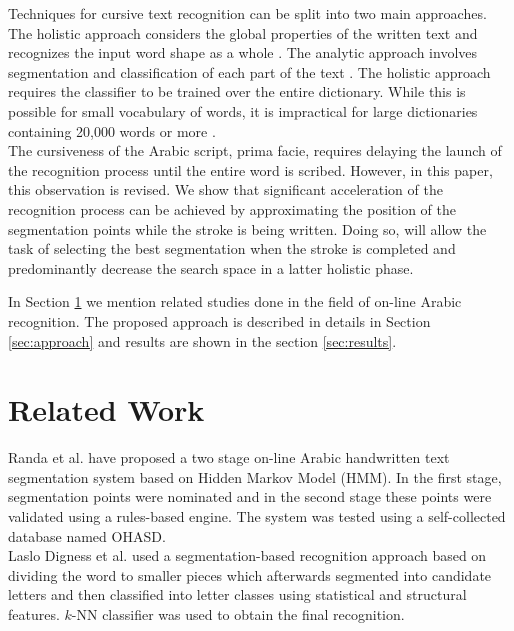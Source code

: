 \documentclass[10pt, conference, compsocconf]{IEEEtran}
\begin{document}
Techniques for cursive text recognition can be split into two main approaches. 
The holistic approach considers the global properties of the written text and recognizes the input word shape as a whole \cite{biadsy2011segmentation, saabni2009hierarchical}. 
The analytic approach involves segmentation and classification of each part of the text \cite{abdulla2008off, sari2002off, Dinges2011}. 
The holistic approach requires the classifier to be trained over the entire dictionary. 
While this is possible for small vocabulary of words, it is impractical for large dictionaries containing 20,000 words or more \cite{elanwar2012unconstrained}.\\

{\color{blue}
The cursiveness of the Arabic script, prima facie, requires delaying the launch of the recognition process until the entire word is scribed. 
However, in this paper, this observation is revised. 
We show that significant acceleration of the recognition process can be achieved by approximating the position of the segmentation points while the stroke is being written. 
Doing so, will allow the task of selecting the best segmentation when the stroke is completed and predominantly decrease the search space in a latter holistic phase.\\}

In Section \ref{sec:related_work} we mention related studies done in the field of on-line Arabic recognition. 
The proposed approach is described in details in Section \ref{sec:approach} and results are shown in the section \ref{sec:results}. 

\section{Related Work}
\label{sec:related_work}

Randa et al. \cite{elanwar2012unconstrained} have proposed a two stage on-line Arabic handwritten text segmentation system based on Hidden Markov Model (HMM). 
In the first stage, segmentation points were nominated and in the second stage these points were validated using a rules-based engine. 
The system was tested using a self-collected database named OHASD.\\

Laslo Digness et al. \cite{Dinges2011} used a segmentation-based recognition approach based on dividing the word to smaller pieces which afterwards segmented into candidate letters and then classified into letter classes using statistical and structural features. 
$k$-NN classifier was used to obtain the final recognition.\\
\end{document}
